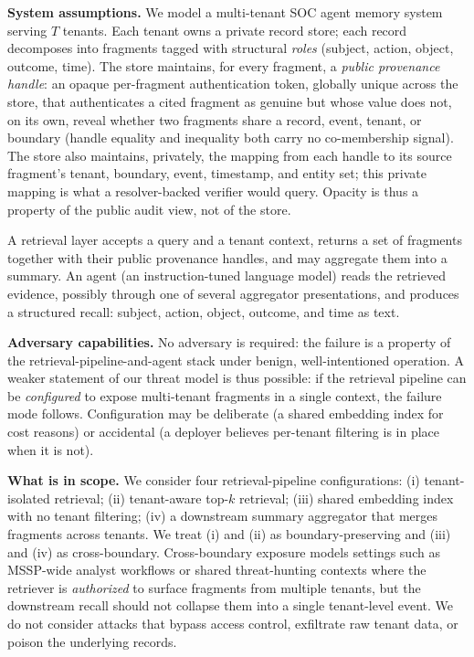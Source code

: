 \documentclass[conference,compsoc]{IEEEtran}
\begin{document}
\textbf{System assumptions.}
We model a multi-tenant SOC agent memory system serving $T$ tenants. Each tenant owns a private record store; each record decomposes into fragments tagged with structural \emph{roles} (subject, action, object, outcome, time). The store maintains, for every fragment, a \emph{public provenance handle}: an opaque per-fragment authentication token, globally unique across the store, that authenticates a cited fragment as genuine but whose value does not, on its own, reveal whether two fragments share a record, event, tenant, or boundary (handle equality and inequality both carry no co-membership signal). The store also maintains, privately, the mapping from each handle to its source fragment's tenant, boundary, event, timestamp, and entity set; this private mapping is what a resolver-backed verifier would query. Opacity is thus a property of the public audit view, not of the store.

A retrieval layer accepts a query and a tenant context, returns a set of fragments together with their public provenance handles, and may aggregate them into a summary. An agent (an instruction-tuned language model) reads the retrieved evidence, possibly through one of several aggregator presentations, and produces a structured recall: subject, action, object, outcome, and time as text.

\textbf{Adversary capabilities.}
No adversary is required: the failure is a property of the retrieval-pipeline-and-agent stack under benign, well-intentioned operation. A weaker statement of our threat model is thus possible: if the retrieval pipeline can be \emph{configured} to expose multi-tenant fragments in a single context, the failure mode follows. Configuration may be deliberate (a shared embedding index for cost reasons) or accidental (a deployer believes per-tenant filtering is in place when it is not).

\textbf{What is in scope.}
We consider four retrieval-pipeline configurations: (i) tenant-isolated retrieval; (ii) tenant-aware top-$k$ retrieval; (iii) shared embedding index with no tenant filtering; (iv) a downstream summary aggregator that merges fragments across tenants. We treat (i) and (ii) as boundary-preserving and (iii) and (iv) as cross-boundary. Cross-boundary exposure models settings such as MSSP-wide analyst workflows or shared threat-hunting contexts where the retriever is \emph{authorized} to surface fragments from multiple tenants, but the downstream recall should not collapse them into a single tenant-level event. We do not consider attacks that bypass access control, exfiltrate raw tenant data, or poison the underlying records.
\end{document}
